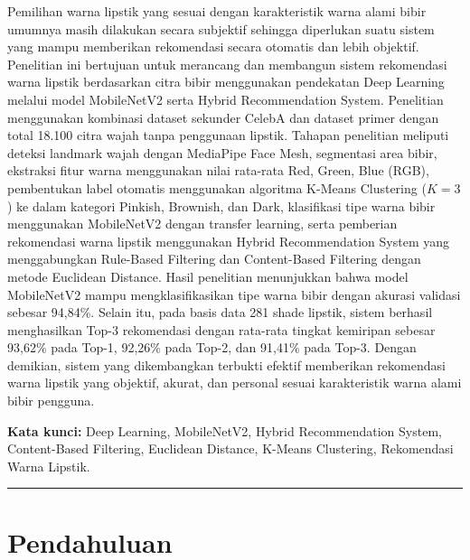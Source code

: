 \documentclass[10pt,a4paper]{article}
\begin{document}
{\fontsize{10pt}{13pt}\selectfont
Pemilihan warna lipstik yang sesuai dengan karakteristik warna alami bibir umumnya masih dilakukan secara subjektif sehingga diperlukan suatu sistem yang mampu memberikan rekomendasi secara otomatis dan lebih objektif. Penelitian ini bertujuan untuk merancang dan membangun sistem rekomendasi warna lipstik berdasarkan citra bibir menggunakan pendekatan Deep Learning melalui model MobileNetV2 serta Hybrid Recommendation System. Penelitian menggunakan kombinasi dataset sekunder CelebA dan dataset primer dengan total 18.100 citra wajah tanpa penggunaan lipstik. Tahapan penelitian meliputi deteksi landmark wajah dengan MediaPipe Face Mesh, segmentasi area bibir, ekstraksi fitur warna menggunakan nilai rata-rata Red, Green, Blue (RGB), pembentukan label otomatis menggunakan algoritma K-Means Clustering ($K=3$) ke dalam kategori Pinkish, Brownish, dan Dark, klasifikasi tipe warna bibir menggunakan MobileNetV2 dengan transfer learning, serta pemberian rekomendasi warna lipstik menggunakan Hybrid Recommendation System yang menggabungkan Rule-Based Filtering dan Content-Based Filtering dengan metode Euclidean Distance. Hasil penelitian menunjukkan bahwa model MobileNetV2 mampu mengklasifikasikan tipe warna bibir dengan akurasi validasi sebesar 94,84\%. Selain itu, pada basis data 281 shade lipstik, sistem berhasil menghasilkan Top-3 rekomendasi dengan rata-rata tingkat kemiripan sebesar 93,62\% pada Top-1, 92,26\% pada Top-2, dan 91,41\% pada Top-3. Dengan demikian, sistem yang dikembangkan terbukti efektif memberikan rekomendasi warna lipstik yang objektif, akurat, dan personal sesuai karakteristik warna alami bibir pengguna.\par}

\vspace{4pt}
{\fontsize{10pt}{12pt}\selectfont\textbf{Kata kunci:} Deep Learning, MobileNetV2, Hybrid Recommendation System, Content-Based Filtering, Euclidean Distance, K-Means Clustering, Rekomendasi Warna Lipstik.\par}

\vspace{3pt}
\noindent\rule{\textwidth}{0.4pt}
\vspace{4pt}

\section{Pendahuluan }
\end{document}
